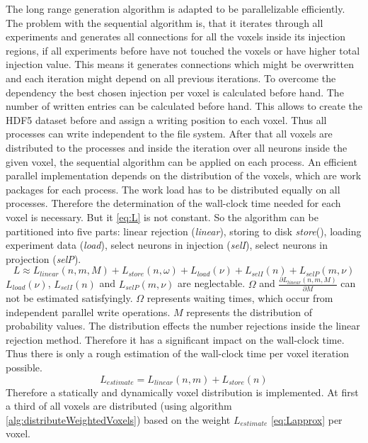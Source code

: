 The long range generation algorithm is adapted to be parallelizable efficiently.
The problem with the sequential algorithm is, that it iterates through all experiments
and generates all connections for all the voxels inside its injection regions, if 
all experiments before have not touched the voxels or have higher total injection
value. This means it generates connections which might be overwritten and each iteration might depend
on all previous iterations. To overcome the dependency the best chosen injection per voxel is calculated before hand.
The number of written entries can be calculated before hand. This allows to create
the HDF5 dataset before and assign a writing position to each voxel.
Thus all processes can write independent to the file system.
After that all voxels are distributed to the processes and inside the iteration over all neurons
inside the given voxel, the sequential algorithm can be applied on each process.
An efficient parallel implementation depends on the distribution of the voxels, which are
work packages for each process. The work load has to be distributed equally on all processes.
Therefore the determination of the wall-clock time needed for each voxel is necessary.
But it \ref{eq:L} is not constant.
So the algorithm can be partitioned into five parts: linear rejection (\emph{linear}), storing to disk \emph{store}(),
loading experiment data (\emph{load}), select neurons in injection (\emph{selI}), select neurons in projection (\emph{selP}).
\begin{equation} \label{eq:L}
	L \approx L_{linear}(n,m,M) + L_{store}(n,\omega) + L_{load}(\nu) + L_{selI}(n) + L_{selP}(m,\nu)
\end{equation}
$L_{load}(\nu)$, $L_{selI}(n)$ and $L_{selP}(m,\nu)$ are neglectable.
$\Omega$ and $\frac{\partial L_{linear}(n,m,M)}{\partial M}$  can not be estimated satisfyingly.
$\Omega$ represents waiting times, which occur from independent parallel write operations.
$M$ represents the distribution of probability values.
The distribution effects the number rejections inside the linear rejection method.
Therefore it has a significant impact on the wall-clock time.
Thus there is only a rough estimation of the wall-clock time per voxel iteration possible.
\begin{equation} \label{eq:Lapprox}
	L_{estimate} = L_{linear}(n,m) + L_{store}(n)
\end{equation}
Therefore a statically and dynamically voxel distribution is implemented.
At first a third of all voxels are distributed (using algorithm \ref{alg:distributeWeightedVoxels}) based on the weight $L_{estimate}$ \ref{eq:Lapprox}  per voxel.
